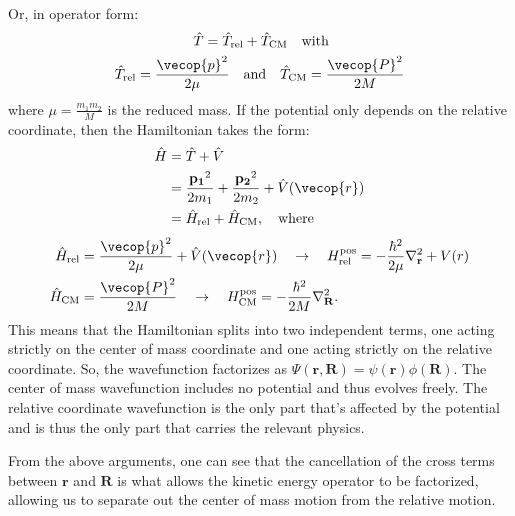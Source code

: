 Or, in operator form:
\begin{align*}
    \hat{T}= \hat{T}_{\text{rel}} &+ \hat{T}_{\text{CM}} \quad\text{with}\\
    \hat{T}_\text{rel}=\frac{\vecop{p}^2}{2\mu}\quad&\text{and}\quad\hat{T}_{\text{CM}}=\frac{\vecop{P}^2}{2M}
\end{align*}
where $\mu =\frac{m_1m_2}{M}$ is the reduced mass. If the potential only depends on the relative coordinate, then the Hamiltonian takes the form:
\begin{align*}
    \hat{H} & = \hat{T} + \hat{V} \\
            & = \frac{\mathbf{p_1}^2}{2m_1}+\frac{\mathbf{p_2}^2}{2m_2} + \hat{V}(\vecop{r})\\
            &= \hat{H}_{\text{rel}} + \hat{H}_{\text{CM}}, \quad\text{where}
\end{align*}
\begin{align}
    \hat{H}_\text{rel}&=\frac{\vecop{p}^2}{2\mu}+\hat{V}(\vecop{r})\quad\rightarrow\quad H^{\text{pos}}_\text{rel}=-\frac{\hbar^2}{2\mu}\nabla^2_{\mathbf{r}}+V(r)\label{eq:ham_rel}\\ 
    \hat{H}_\text{CM}&=\frac{\vecop{P}^2}{2M}\quad\rightarrow\quad H^{\text{pos}}_\text{CM}=-\frac{\hbar^2}{2M}\nabla^2_{\mathbf{R}}\nonumber.
\end{align}
This means that the Hamiltonian splits into two independent terms, one acting strictly on the center of mass coordinate and one acting strictly on the relative coordinate. So, the wavefunction factorizes as $\Psi(\mathbf{r}, \mathbf{R}) = \psi(\mathbf{r})\phi(\mathbf{R})$. The center of mass wavefunction includes no potential and thus evolves freely. The relative coordinate wavefunction is the only part that's affected by the potential and is thus the only part that carries the relevant physics. 

From the above arguments, one can see that the cancellation of the cross terms between $\mathbf{r}$ and $\mathbf{R}$ is what allows the kinetic energy operator to be factorized, allowing us to separate out the center of mass motion from the relative motion.

